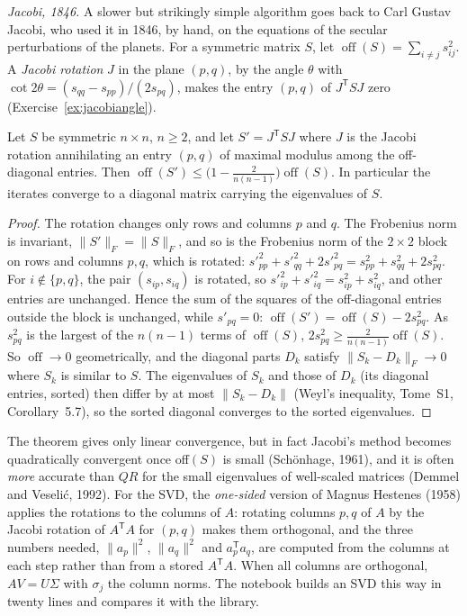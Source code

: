 \emph{Jacobi, 1846.} A slower but strikingly simple algorithm goes back to Carl Gustav Jacobi, who used it in 1846, by hand, on the equations of the
secular perturbations of the planets. For a symmetric matrix $S$, let $\operatorname{off}(S)=\sum_{i\ne j}s_{ij}^2$. A \emph{Jacobi rotation} $J$ in the plane $(p,q)$,
by the angle $\theta$ with $\cot2\theta=(s_{qq}-s_{pp})/(2s_{pq})$, makes the entry $(p,q)$ of $J^{\mathsf T}SJ$ zero (Exercise~\ref{ex:jacobiangle}).

\begin{theorem}\label{thm:jacobi}
Let $S$ be symmetric $n\times n$, $n\ge2$, and let $S'=J^{\mathsf T}SJ$ where $J$ is the Jacobi rotation annihilating an entry $(p,q)$ of maximal modulus
among the off-diagonal entries. Then $\operatorname{off}(S')\le\bigl(1-\frac2{n(n-1)}\bigr)\operatorname{off}(S)$. In particular the iterates converge to a
diagonal matrix carrying the eigenvalues of $S$.
\end{theorem}
\begin{proof}
The rotation changes only rows and columns $p$ and $q$. The Frobenius norm is invariant, $\|S'\|_F=\|S\|_F$, and so is the Frobenius norm of the
$2\times2$ block on rows and columns $p,q$, which is rotated: $s'^2_{pp}+s'^2_{qq}+2s'^2_{pq}=s_{pp}^2+s_{qq}^2+2s_{pq}^2$. For $i\notin\{p,q\}$, the pair
$(s_{ip},s_{iq})$ is rotated, so $s'^2_{ip}+s'^2_{iq}=s_{ip}^2+s_{iq}^2$, and other entries are unchanged. Hence the sum of the squares of the
off-diagonal entries outside the block is unchanged, while $s'_{pq}=0$: $\operatorname{off}(S')=\operatorname{off}(S)-2s_{pq}^2$. As $s_{pq}^2$ is the
largest of the $n(n-1)$ terms of $\operatorname{off}(S)$, $2s_{pq}^2\ge\frac2{n(n-1)}\operatorname{off}(S)$. So $\operatorname{off}\to0$ geometrically, and
the diagonal parts $D_k$ satisfy $\|S_k-D_k\|_F\to0$ where $S_k$ is similar to $S$. The eigenvalues of $S_k$ and those of $D_k$ (its diagonal entries, sorted)
then differ by at most $\|S_k-D_k\|$ (Weyl's inequality, Tome~S1, Corollary~5.7), so the sorted diagonal converges to the sorted eigenvalues.
\end{proof}

The theorem gives only linear convergence, but in fact Jacobi's method becomes quadratically convergent once off$(S)$ is small (Sch\"onhage, 1961), and it
is often \emph{more} accurate than $QR$ for the small eigenvalues of well-scaled matrices (Demmel and Veseli\'c, 1992). For the SVD, the \emph{one-sided}
version of Magnus Hestenes (1958) applies the rotations to the columns of $A$: rotating columns $p,q$ of $A$ by the Jacobi rotation of $A^{\mathsf T}A$
for $(p,q)$ makes them orthogonal, and the three numbers needed, $\|a_p\|^2$, $\|a_q\|^2$ and $a_p^{\mathsf T}a_q$, are computed from the columns at each step
rather than from a stored $A^{\mathsf T}A$. When all columns are orthogonal, $AV=U\Sigma$ with $\sigma_j$ the column norms. The notebook builds an SVD this
way in twenty lines and compares it with the library.

